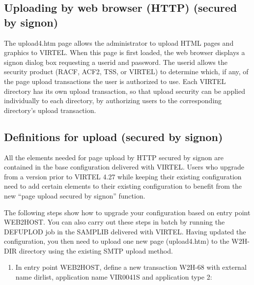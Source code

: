 \documentclass[letterpaper,10pt,english]{sphinxmanual}
\begin{document}
\subsection{Uploading by web browser (HTTP) (secured by signon)}
\label{\detokenize{audit_operations_ and_performance:uploading-by-web-browser-http-secured-by-signon}}\label{\detokenize{audit_operations_ and_performance:index-57}}
The upload4.htm page allows the administrator to upload HTML pages and graphics to VIRTEL. When this page is first loaded, the web browser displays a signon dialog box requesting a userid and password. The userid allows the security product (RACF, ACF2, TSS, or VIRTEL) to determine which, if any, of the page upload transactions the user is authorized to use. Each VIRTEL directory has its own upload transaction, so that upload security can be applied individually to each directory, by authorizing users to the corresponding directory’s upload transaction.

\ignorespaces 

\subsection{Definitions for upload (secured by signon)}
\label{\detokenize{audit_operations_ and_performance:definitions-for-upload-secured-by-signon}}\label{\detokenize{audit_operations_ and_performance:index-58}}
All the elements needed for page upload by HTTP secured by signon are contained in the base configuration delivered with VIRTEL. Users who upgrade from a version prior to VIRTEL 4.27 while keeping their existing configuration need to add certain elements to their existing configuration to benefit from the new “page upload secured by signon” function.

The following steps show how to upgrade your configuration based on entry point WEB2HOST. You can also carry out these steps in batch by running the DEFUPLOD job in the SAMPLIB delivered with VIRTEL. Having updated the configuration, you then need to upload one new page (upload4.htm) to the W2H-DIR directory using the existing SMTP upload method.
\begin{enumerate}
\def\theenumi{\arabic{enumi}}
\def\labelenumi{\theenumi .}
\makeatletter\def\p@enumii{\p@enumi \theenumi .}\makeatother
\item {} 
In entry point WEB2HOST, define a new transaction W2H-68 with external name dirlist, application name VIR0041S and application type 2:

\end{enumerate}
\end{document}
